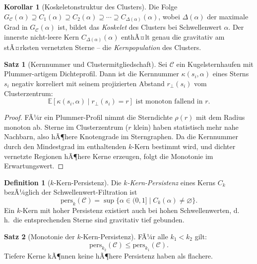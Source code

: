 ﻿\documentclass[a4paper,12pt]{report}
\theoremstyle{definition}
\newtheorem{definition}{Definition}
\newtheorem{satz}{Satz}
\newtheorem{korollar}{Korollar}
\begin{document}
\begin{korollar}[Koskeletonstruktur des Clusters]
\label{kor:koskelet}
Die Folge $G_\mathcal{C}(\alpha) \supseteq C_1(\alpha) \supseteq C_2(\alpha) \supseteq \cdots \supseteq C_{\Delta(\alpha)}(\alpha)$, wobei $\Delta(\alpha)$ der maximale Grad in $G_\mathcal{C}(\alpha)$ ist, bildet das \emph{Koskelet} des Clusters bei Schwellenwert $\alpha$. Der innerste nicht-leere Kern $C_{\Delta(\alpha)}(\alpha)$ enthÃ¤lt genau die gravitativ am stÃ¤rksten vernetzten Sterne -- die \emph{Kernpopulation} des Clusters.
\end{korollar}

\begin{satz}[Kernnummer und Clustermitgliedschaft]
\label{satz:kernnummer}
Sei $\mathcal{C}$ ein Kugelsternhaufen mit Plummer-artigem Dichteprofil. Dann ist die Kernnummer $\kappa(s_i, \alpha)$ eines Sterns $s_i$ negativ korreliert mit seinem projizierten Abstand $r_\perp(s_i)$ vom Clusterzentrum:
\[
\mathbb{E}[\kappa(s_i, \alpha) \mid r_\perp(s_i) = r] \text{ ist monoton fallend in } r.
\]
\end{satz}

\begin{proof}
FÃ¼r ein Plummer-Profil nimmt die Sterndichte $\rho(r)$ mit dem Radius monoton ab. Sterne im Clusterzentrum ($r$ klein) haben statistisch mehr nahe Nachbarn, also hÃ¶here Knotengrade im Sterngraphen. Da die Kernnummer durch den Mindestgrad im enthaltenden $k$-Kern bestimmt wird, und dichter vernetzte Regionen hÃ¶here Kerne erzeugen, folgt die Monotonie im Erwartungswert.
\end{proof}

\begin{definition}[$k$-Kern-Persistenz]
\label{def:kcore_persistenz}
Die \emph{$k$-Kern-Persistenz} eines Kerns $C_k$ bezÃ¼glich der Schwellenwert-Filtration ist
\[
\mathrm{pers}_k(\mathcal{C}) = \sup\{\alpha \in (0,1] \mid C_k(\alpha) \neq \varnothing\}.
\]
Ein $k$-Kern mit hoher Persistenz existiert auch bei hohen Schwellenwerten, d.\,h.\ die entsprechenden Sterne sind gravitativ tief gebunden.
\end{definition}

\begin{satz}[Monotonie der $k$-Kern-Persistenz]
\label{satz:kcore_mono}
FÃ¼r alle $k_1 < k_2$ gilt:
\[
\mathrm{pers}_{k_2}(\mathcal{C}) \leq \mathrm{pers}_{k_1}(\mathcal{C}).
\]
Tiefere Kerne kÃ¶nnen keine hÃ¶here Persistenz haben als flachere.
\end{satz}
\end{document}
